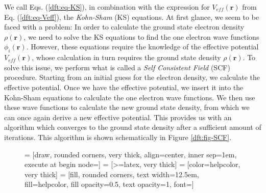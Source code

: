 \begin{refsection}
We call Eqs. (\ref{dft:eq-KS}), in combination with the expression for 
$V_{eff}(\mathbf{r})$ from Eq. (\ref{dft:eq-Veff}), the \textit{Kohn-Sham} (KS) 
equations. At first glance, we seem to be faced with a problem: In order to 
calculate the ground state electron density $\rho(\mathbf{r})$, we need to 
solve the KS equations to find the one electron wave functions 
$\phi_i(\mathbf{r})$. However, these equations require the knowledge of the 
effective potential $V_{eff}(\mathbf{r})$, whose calculation in turn requires 
the ground state density $\rho(\mathbf{r})$. To solve this issue, we perform 
what is called a \textit{Self Consistent Field} (SCF) procedure. Starting from 
an initial guess for the electron density, we calculate the effective 
potential. Once we have the effective potential, we insert it into the 
Kohn-Sham equations to calculate the one electron wave functions. We then use 
these wave functions to calculate the new ground state density, from which we 
can once again derive a new effective potential. This provides us with an 
algorithm which converges to the ground state density after a sufficient 
amount of iterations. This algorithm is shown schematically in Figure 
\ref{dft:fig-SCF}.  
 
\begin{figure}[ht]  
\centering 
 
 
 
 
 = [draw, rounded corners, very thick, align=center, inner 
sep=1em, execute at begin node=\setlength{\baselineskip}{2em}] 
 = [>=latex, very thick] 
 = [color=helpcolor, very thick] 
 = [fill, rounded corners, text width=12.5em, 
fill=helpcolor, fill opacity=0.5, text opacity=1, font=\small] 
 
 
\begin{tikzpicture}[node distance=2em] 
 

\end{tikzpicture}
\end{figure}
\end{refsection}
